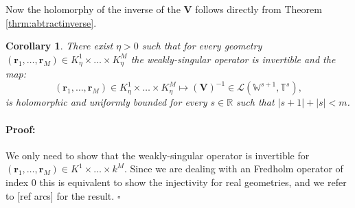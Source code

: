 \documentclass{article}
\newtheorem{corollary}[theorem]{Corollary}
\newenvironment{proof}{\paragraph{Proof:}}{\hfill$\square$}
\newcommand{\todo}[1]{{\color{red}[#1]}}
\newcommand{\IR}{{\mathbb R}}
\newcommand{\br}{\bm{r}}
\begin{document}
Now the holomorphy of the inverse of the $\mathbf{V}$ follows directly from Theorem \ref{thrm:abtractinverse}.
\begin{corollary}
\label{cor:vinvh}
There exist $\eta>0$ such that for every geometry $(\br_1,\hdots, \br_M ) \in K^1_\eta\times\hdots\times K^M_\eta$ the weakly-singular operator is invertible and the map:
$$
(\br_1,\hdots, \br_M ) \in K^1_\eta\times\hdots\times K^M_\eta \mapsto (\mathbf{V})^{-1} \in \mathcal{L}(\mathbb{W}^{s+1},\mathbb{T}^s),$$
is holomorphic and uniformly bounded for every $s \in \IR$ such that $|s+1|+|s| < m$.  
\end{corollary}
\begin{proof}
We only need to show that the weakly-singular operator is invertible for $(\br_1,\hdots,\br_M) \in K^1\times\hdots\times k^M$. Since we are dealing with an Fredholm operator of index $0$ this is equivalent to show the injectivity for real geometries, and we refer to \todo{ref arcs} for the result. 
\end{proof}
\end{document}
